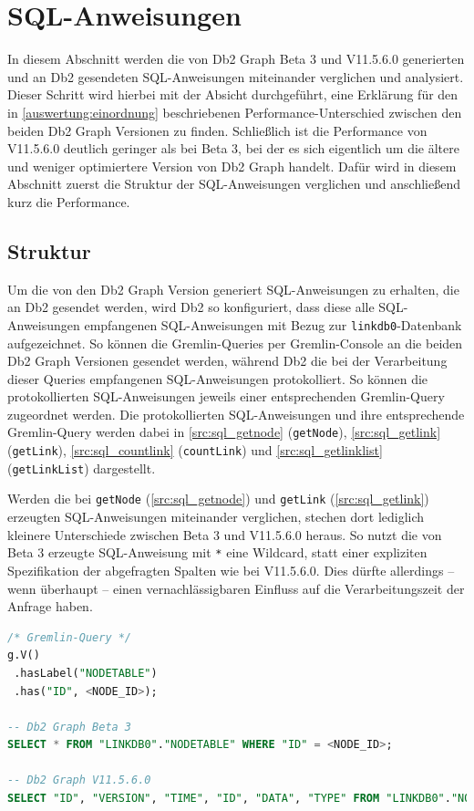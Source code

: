 \section{SQL-Anweisungen}
\label{sql}
In diesem Abschnitt werden die von Db2 Graph Beta 3 und V11.5.6.0 generierten und an Db2 gesendeten SQL-Anweisungen miteinander verglichen und analysiert. Dieser Schritt wird hierbei mit der Absicht durchgeführt, eine Erklärung für den in \autoref{auswertung:einordnung} beschriebenen Performance-Unterschied zwischen den beiden Db2 Graph Versionen zu finden. Schließlich ist die Performance von V11.5.6.0  deutlich geringer als bei Beta 3, bei der es sich eigentlich um die ältere und weniger optimiertere Version von Db2 Graph handelt. Dafür wird in diesem Abschnitt zuerst die Struktur der SQL-Anweisungen verglichen und anschließend kurz die Performance. 

\subsection{Struktur}
\label{sql:struktur}
Um die von den Db2 Graph Version generiert SQL-Anweisungen zu erhalten, die an Db2 gesendet werden, wird Db2 so konfiguriert, dass diese alle SQL-Anweisungen empfangenen SQL-Anweisungen mit Bezug zur \texttt{linkdb0}-Datenbank aufgezeichnet. So können die Gremlin-Queries per Gremlin-Console an die beiden Db2 Graph Versionen gesendet werden, während Db2 die bei der Verarbeitung dieser Queries empfangenen SQL-Anweisungen protokolliert. So können die protokollierten SQL-Anweisungen jeweils einer entsprechenden Gremlin-Query zugeordnet werden. Die protokollierten SQL-Anweisungen und ihre entsprechende Gremlin-Query werden dabei in \autoref{src:sql_getnode} (\texttt{getNode}), \autoref{src:sql_getlink} (\texttt{getLink}), \autoref{src:sql_countlink} (\texttt{countLink}) und \autoref{src:sql_getlinklist} (\texttt{getLinkList}) dargestellt.

Werden die bei \texttt{getNode} (\autoref{src:sql_getnode}) und \texttt{getLink} (\autoref{src:sql_getlink}) erzeugten SQL-Anweisungen miteinander verglichen,  stechen dort lediglich kleinere Unterschiede zwischen Beta 3 und V11.5.6.0 heraus. So nutzt die von Beta 3 erzeugte SQL-Anweisung mit \texttt{*} eine Wildcard, statt einer expliziten Spezifikation der abgefragten Spalten wie bei V11.5.6.0. Dies dürfte allerdings -- wenn überhaupt -- einen vernachlässigbaren Einfluss auf die Verarbeitungszeit der Anfrage haben.

\begin{lstlisting}[caption={Generierter SQL-Code getNode},label=src:sql_getnode,language=SQL]
/* Gremlin-Query */
g.V()
 .hasLabel("NODETABLE")
 .has("ID", <NODE_ID>);

-- Db2 Graph Beta 3
SELECT * FROM "LINKDB0"."NODETABLE" WHERE "ID" = <NODE_ID>;

-- Db2 Graph V11.5.6.0
SELECT "ID", "VERSION", "TIME", "ID", "DATA", "TYPE" FROM "LINKDB0"."NODETABLE" WHERE "ID" = <NODE_ID>;
\end{lstlisting}


